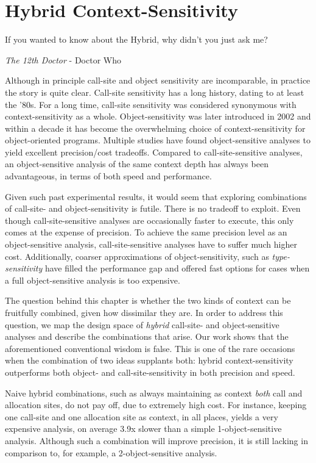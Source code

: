 \chapter{Hybrid Context-Sensitivity}
\label{chapter:hybrid}
\epigraph{If you wanted to know about the Hybrid, why didn’t you just ask me?}{\textit{The 12th Doctor} - Doctor Who}

Although in principle call-site and object sensitivity are incomparable, in practice the story is quite clear. Call-site sensitivity has a long history, dating to at least the '80s. For a long time, call-site sensitivity was considered synonymous with context-sensitivity as a whole. Object-sensitivity was later introduced in 2002 \cite{issta:2002:Milanova} and within a decade it has become the overwhelming choice of context-sensitivity for object-oriented programs. Multiple studies \cite{pldi:2006:Naik,paste:2005:Liang,thesis:Lhotak,article:2008:tosem:Lhotak,oopsla:2009:Bravenboer} have found object-sensitive analyses to yield excellent precision/cost tradeoffs. Compared to call-site-sensitive analyses, an object-sensitive analysis of the same context depth has always been advantageous, in terms of both speed and performance.

Given such past experimental results, it would seem that exploring combinations of call-site- and object-sensitivity is futile. There is no tradeoff to exploit. Even though call-site-sensitive analyses are occasionally faster to execute, this only comes at the expense of precision. To achieve the same precision level as an object-sensitive analysis, call-site-sensitive analyses have to suffer much higher cost. Additionally, coarser approximations of object-sensitivity, such as \emph{type-sensitivity} \cite{popl:2011:Smaragdakis} have filled the performance gap and offered fast options for cases when a full object-sensitive analysis is too expensive.

The question behind this chapter is whether the two kinds of context can be fruitfully combined, given how dissimilar they are. In order to address this question, we map the design space of \emph{hybrid} call-site- and object-sensitive analyses and describe the combinations that arise. Our work shows that the aforementioned conventional wisdom is false. This is one of the rare occasions when the combination of two ideas supplants both: hybrid context-sensitivity outperforms both object- and call-site-sensitivity in both precision and speed.

Naive hybrid combinations, such as always maintaining as context \emph{both} call and allocation sites, do not pay off, due to extremely high cost. For instance, keeping one call-site and one allocation site as context, in all places, yields a very expensive analysis, on average 3.9x slower than a simple 1-object-sensitive analysis. Although such a combination will improve precision, it is still lacking in comparison to, for example, a 2-object-sensitive analysis.


